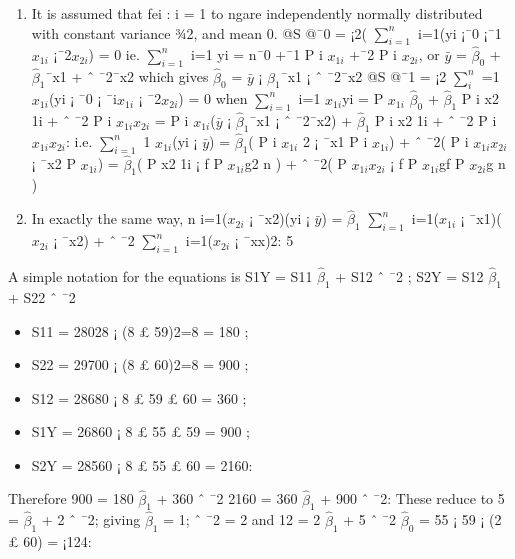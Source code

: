 \documentclass[a4paper,12pt]{article}
\begin{document}
\begin{enumerate}
\item  It is assumed that fei : i = 1 to ngare independently normally distributed with constant
variance ¾2, and mean 0.
@S
@¯0
= ¡2(
$\sum^{n}_{i=1}$
i=1(yi ¡¯0 ¡¯1$x_{1i}$ ¡¯2$x_{2i}$) = 0 ie.
$\sum^{n}_{i=1}$
i=1 yi = n¯0 +¯1
P
i $x_{1i}$ +¯2
P
i $x_{2i}$, or
$\bar{y}$ = $\hat{\beta}_0$ + $\hat{\beta}_1$¯x1 + ˆ ¯2¯x2 which gives $\hat{\beta}_0$ = $\bar{y}$ ¡ $\hat{\beta}_1$¯x1 ¡ ˆ ¯2¯x2
@S
@¯1
= ¡2
$\sum^{n}_{i}$
=1 $x_{1i}$(yi ¡ ¯0 ¡ ¯i$x_{1i}$ ¡ ¯2$x_{2i}$) = 0 when
$\sum^{n}_{i=1}$
i=1 $x_{1i}$yi =
P
$x_{1i}$ $\hat{\beta}_0$ + $\hat{\beta}_1$
P
i x2
1i + ˆ ¯2
P
i $x_{1i}$$x_{2i}$ =
P
i $x_{1i}$($\bar{y}$ ¡ $\hat{\beta}_1$¯x1 ¡ ˆ ¯2¯x2) + $\hat{\beta}_1$
P
i x2
1i +
ˆ ¯2
P
i $x_{1i}$$x_{2i}$:
i.e.
$\sum^{n}_{i=1}$
1 $x_{1i}$(yi ¡ $\bar{y}$) = $\hat{\beta}_1$(
P
i $x_{1i}$
2 ¡ ¯x1
P
i $x_{1i}$) + ˆ ¯2(
P
i $x_{1i}$$x_{2i}$ ¡ ¯x2
P
$x_{1i}$) = $\hat{\beta}_1$(
P
x2
1i ¡
f
P
$x_{1i}$g2
n ) + ˆ ¯2(
P
$x_{1i}$$x_{2i}$ ¡ f
P
$x_{1i}$gf
P
$x_{2i}$g
n ) 
\item In exactly the same way, n
i=1($x_{2i}$ ¡ ¯x2)(yi ¡ $\bar{y}$) = $\hat{\beta}_1$
$\sum^{n}_{i=1}$
i=1($x_{1i}$ ¡ ¯x1)($x_{2i}$ ¡ ¯x2) + ˆ ¯2
$\sum^{n}_{i=1}$
i=1($x_{2i}$ ¡ ¯xx)2:
5
\end{enumerate}
\item  A simple notation for the equations is S1Y = S11 $\hat{\beta}_1$ + S12 ˆ ¯2 ; S2Y = S12 $\hat{\beta}_1$ + S22 ˆ ¯2

\begin{itemize}
\item S11 = 28028 ¡ (8 £ 59)2=8 = 180 ; 
\item S22 = 29700 ¡ (8 £ 60)2=8 = 900 ; 
\item S12 = 28680 ¡ 8 £
59 £ 60 = 360 ; 
\item S1Y = 26860 ¡ 8 £ 55 £ 59 = 900 ; 
\item S2Y = 28560 ¡ 8 £ 55 £ 60 = 2160:
\end{itemize}
Therefore 900 = 180 $\hat{\beta}_1$ + 360 ˆ ¯2 2160 = 360 $\hat{\beta}_1$ + 900 ˆ ¯2:
These reduce to 5 = $\hat{\beta}_1$ + 2 ˆ ¯2; giving $\hat{\beta}_1$ = 1; ˆ ¯2 = 2 and 12 = 2 $\hat{\beta}_1$ + 5 ˆ ¯2 $\hat{\beta}_0$ =
55 ¡ 59 ¡ (2 £ 60) = ¡124:
\end{document}
